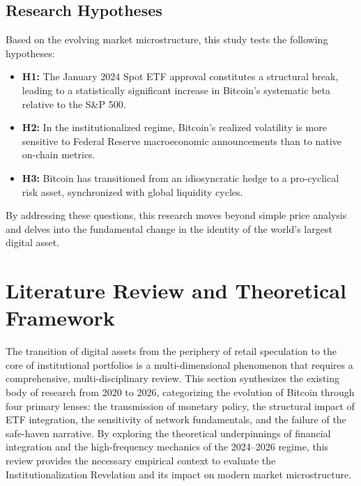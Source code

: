 \documentclass[10pt, conference, compsocconf]{IEEEtran}
\begin{document}
\subsection{Research Hypotheses}
Based on the evolving market microstructure, this study tests the following hypotheses:
\begin{itemize}
    \item \textbf{H1:} The January 2024 Spot ETF approval constitutes a structural break, leading to a statistically significant increase in Bitcoin's systematic beta relative to the S\&P 500.
    \item \textbf{H2:} In the institutionalized regime, Bitcoin's realized volatility is more sensitive to Federal Reserve macroeconomic announcements than to native on-chain metrics.
    \item \textbf{H3:} Bitcoin has transitioned from an idiosyncratic hedge to a pro-cyclical risk asset, synchronized with global liquidity cycles.
\end{itemize}

By addressing these questions, this research moves beyond simple price analysis and delves into the fundamental change in the identity of the world's largest digital asset.


\section{Literature Review and Theoretical Framework}

The transition of digital assets from the periphery of retail speculation to the core of institutional portfolios is a multi-dimensional phenomenon that requires a comprehensive, multi-disciplinary review. This section synthesizes the existing body of research from 2020 to 2026, categorizing the evolution of Bitcoin through four primary lenses: the transmission of monetary policy, the structural impact of ETF integration, the sensitivity of network fundamentals, and the failure of the safe-haven narrative. By exploring the theoretical underpinnings of financial integration and the high-frequency mechanics of the 2024--2026 regime, this review provides the necessary empirical context to evaluate the Institutionalization Revelation and its impact on modern market microstructure.
\end{document}
